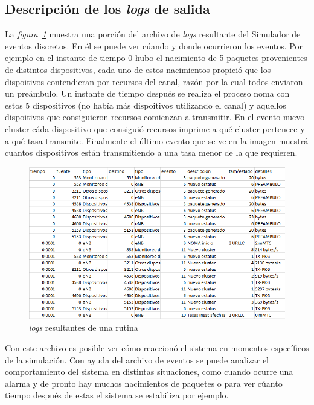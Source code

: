 \subsection{Descripción de los \textit{logs} de salida}

La \textit{figura~\ref{fig:logsdes}} muestra una porción del archivo de \textit{logs} resultante del Simulador de eventos discretos. En él se puede ver cúando y donde ocurrieron los eventos. Por ejemplo en el instante de tiempo 0 hubo el nacimiento de 5 paquetes provenientes de distintos dispositivos, cada uno de estos nacimientos propició que los dispoitivos contendieran por recursos del canal, razón por la cual todos enviaron un preámbulo. Un instante de tiempo después se realiza el proceso noma con estos 5 dispositivos (no había más dispoitivos utilizando el canal) y aquellos dispoitivos que consiguieron recursos comienzan a transmitir. En el evento nuevo cluster cáda dispositivo que consiguió recursos imprime a qué cluster pertenece y a qué tasa transmite. Finalmente el último evento que se ve en la imagen muestrá cuantos dispositivos están transmitiendo a una tasa menor de la que requieren. \newline

\begin{figure}[th]
    \centering
    \includegraphics[scale=0.8]{Figures/logsdes.png}
    \decoRule
    \caption[\textit{logs} resultantes de una rutina]{\textit{logs} resultantes de una rutina}
    \label{fig:logsdes}
\end{figure}

Con este archivo es posible ver cómo reaccionó el sistema en momentos específicos de la simulación. Con ayuda del archivo de eventos se puede analizar el comportamiento del sistema en distintas situaciones, como cuando ocurre una alarma y de pronto hay muchos nacimientos de paquetes o para ver cúanto tiempo después de estas el sistema se estabiliza por ejemplo. \newline

